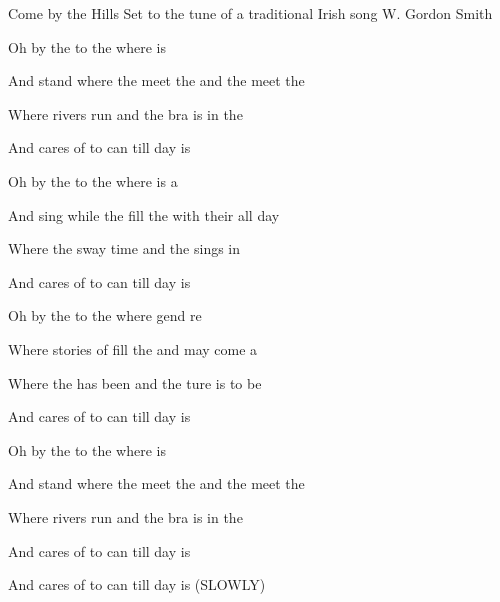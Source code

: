 \begin{SBSong}{Come by the Hills}
  {Set to the tune of a traditional Irish song}
  {W. Gordon Smith}
  
  
  \begin{SBVerse}
   Oh  by the  to the  where  is 

   And stand where the  meet the  and the  meet the 

   Where  rivers run  and the bra is  in the 

   And  cares of to can  till  day is 
  \end{SBVerse}
  \begin{SBVerse}
   Oh  by the  to the  where  is a 

   And sing while the  fill the  with their  all day 

   Where the  sway  time and  the  sings in 

   And  cares of to can  till  day is 
  \end{SBVerse}
  \begin{SBVerse}
   Oh  by the  to the  where gend re

   Where stories of  fill the  and may  come a

   Where the  has been  and the ture is  to be 

   And  cares of to can  till  day is 
  \end{SBVerse}
  \begin{SBVerse}
   Oh  by the  to the  where  is 

   And stand where the  meet the  and the  meet the 

   Where  rivers run  and the bra is  in the 

   And  cares of to can  till  day is 

   And  cares of to can  till  day is  (SLOWLY) 
  \end{SBVerse}
\end{SBSong}

